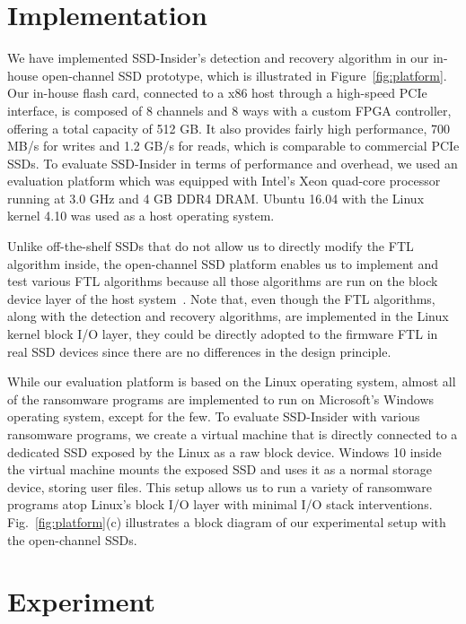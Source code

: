 \documentclass[conference]{IEEEtran}
\newcommand{\ours}{SSD-Insider}
\begin{document}
\section{Implementation}
We have implemented \ours{}'s detection and recovery algorithm in
our in-house open-channel SSD prototype, which is illustrated in
Figure~\ref{fig:platform}.  Our in-house flash card, connected to a
x86 host through a high-speed PCIe interface, is composed of 8
channels and 8 ways with a custom FPGA controller, offering a total
capacity of 512 GB. It also provides fairly high performance, 700
MB/s for writes and 1.2 GB/s for reads, which is comparable to
commercial PCIe SSDs.  To evaluate \ours{} in terms of performance
and overhead, we used an evaluation platform which was equipped
with Intel's Xeon quad-core processor running at 3.0 GHz and 4 GB
DDR4 DRAM. Ubuntu 16.04 with the Linux kernel 4.10 was used as a
host operating system.  

Unlike off-the-shelf SSDs that do not allow us to directly modify
the FTL algorithm inside, the open-channel SSD platform enables us
to implement and test various FTL algorithms because all those
algorithms are run on the block device layer of the host
system~\cite{lightnvm}.  Note that, even though the FTL algorithms,
along with the detection and recovery algorithms, are implemented
in the Linux kernel block I/O layer, they could be directly adopted
to the firmware FTL in real SSD devices since there are no
differences in the design principle.

While our evaluation platform is based on the Linux operating
system, almost all of the ransomware programs are implemented to
run on Microsoft's Windows operating system, except for the few.
To evaluate \ours{} with various ransomware programs, we create a
virtual machine that is directly connected to a dedicated SSD
exposed by the Linux as a raw block device.  Windows 10 inside the
virtual machine mounts the exposed SSD and uses it as a normal
storage device, storing user files. This setup allows us to run a
variety of ransomware programs atop Linux's block I/O layer with
minimal I/O stack interventions. Fig.~\ref{fig:platform}(c)
illustrates a block diagram of our experimental setup with the
open-channel SSDs.



\section{Experiment}
\end{document}
